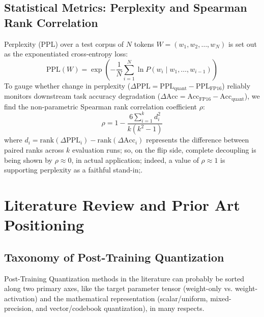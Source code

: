 \documentclass[12pt,a4paper,oneside]{report}
\begin{document}
    \section{Statistical Metrics: Perplexity and Spearman Rank Correlation}
    Perplexity (PPL) over a test corpus of $N$ tokens $W = (w_1, w_2, \dots, w_N)$ is set out as the exponentiated cross-entropy loss:
    \begin{equation}
        \text{PPL}(W) = \exp \left( -\frac{1}{N} \sum_{i=1}^N \ln P(w_i \mid w_1, \dots, w_{i-1}) \right)
    \end{equation}
    To gauge whether change in perplexity ($\Delta\text{PPL} = \text{PPL}_{\text{quant}} - \text{PPL}_{\text{FP16}}$) reliably monitors downstream task accuracy degradation ($\Delta\text{Acc} = \text{Acc}_{\text{FP16}} - \text{Acc}_{\text{quant}}$), we find the non-parametric Spearman rank correlation coefficient $\rho$:
    \begin{equation}
        \rho = 1 - \frac{6 \sum_{i=1}^k d_i^2}{k(k^2 - 1)}
    \end{equation}
    where $d_i = \text{rank}(\Delta\text{PPL}_i) - \text{rank}(\Delta\text{Acc}_i)$ represents the difference between paired ranks across $k$ evaluation runs; so, on the flip side, complete decoupling is being shown by $\rho \approx 0$, in actual application; indeed, a value of $\rho \approx 1$ is supporting perplexity as a faithful stand-in;.

    \chapter{Literature Review and Prior Art Positioning}

    \section{Taxonomy of Post-Training Quantization}
    Post-Training Quantization methods in the literature can probably be sorted along two primary axes, like the target parameter tensor (weight-only vs. weight-activation) and the mathematical representation (scalar/uniform, mixed-precision, and vector/codebook quantization), in many respects.
\end{document}

